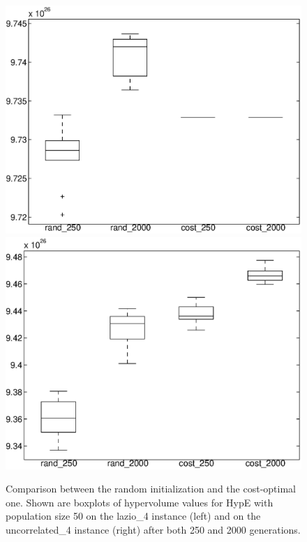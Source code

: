 \documentclass[preprint,12pt]{elsarticle}
\begin{document}
\begin{figure}
	\centering
	\includegraphics[width=0.48\columnwidth]{../experiments/randVsCost/hypervolumes/initBoxPlots_OriginalCosts.eps}
	\hfill
	\includegraphics[width=0.48\columnwidth]{../experiments/randVsCost/hypervolumes/initBoxPlots_New.eps}
	\vspace{-1em}
	\caption{\label{fig:costVsRandBoxPlots} Comparison between the random initialization and the cost-optimal one.
	Shown are boxplots of hypervolume values for HypE with population size 50 on the lazio\_4 instance (left) and on the uncorrelated\_4 instance (right) after both 250 and 2000 generations.}
\end{figure}
\end{document}
